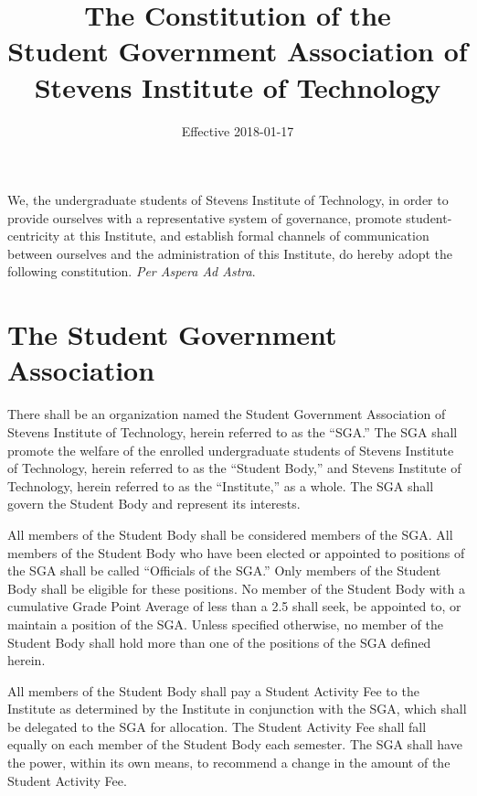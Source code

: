 \documentclass[12pt,oneside]{scrreprt}
\begin{document}
\title{The Constitution of the \\ Student Government Association of \\ Stevens Institute of Technology}
\date{Effective 2018-01-17}
\maketitle

\modulolinenumbers[1]
\linenumbers

We, the undergraduate students of Stevens Institute of Technology, in order to provide ourselves with a representative system of governance, promote student-centricity at this Institute, and establish formal channels of communication between ourselves and the administration of this Institute, do hereby adopt the following constitution. \textit{Per Aspera Ad Astra}.

\chapter{The Student Government Association}
There shall be an organization named the Student Government Association of Stevens Institute of Technology, herein referred to as the ``SGA.'' The SGA shall promote the welfare of the enrolled undergraduate students of Stevens Institute of Technology, herein referred to as the ``Student Body,'' and Stevens Institute of Technology, herein referred to as the ``Institute,'' as a whole. The SGA shall govern the Student Body and represent its interests.

All members of the Student Body shall be considered members of the SGA. All members of the Student Body who have been elected or appointed to positions of the SGA shall be called ``Officials of the SGA.'' Only members of the Student Body shall be eligible for these positions. No member of the Student Body with a cumulative Grade Point Average of less than a 2.5 shall seek, be appointed to, or maintain a position of the SGA. Unless specified otherwise, no member of the Student Body shall hold more than one of the positions of the SGA defined herein.

All members of the Student Body shall pay a Student Activity Fee to the Institute as determined by the Institute in conjunction with the SGA, which shall be delegated to the SGA for allocation. The Student Activity Fee shall fall equally on each member of the Student Body each semester. The SGA shall have the power, within its own means, to recommend a change in the amount of the Student Activity Fee.
\end{document}

